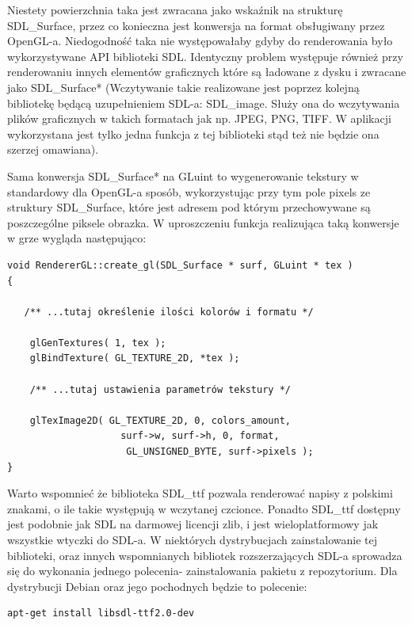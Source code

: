 Niestety powierzchnia taka jest zwracana jako wskaźnik na strukturę SDL\_Surface, przez co konieczna jest konwersja na format obsługiwany przez OpenGL-a. Niedogodność taka nie występowałaby gdyby do renderowania było wykorzystywane API biblioteki SDL. Identyczny problem występuje również przy renderowaniu innych elementów graficznych które są ładowane z dysku i zwracane jako SDL\_Surface* (Wczytywanie takie realizowane jest poprzez kolejną bibliotekę będącą uzupełnieniem SDL-a: SDL\_image. Służy ona do wczytywania plików graficznych w takich formatach jak np. JPEG, PNG, TIFF. W aplikacji wykorzystana jest tylko jedna funkcja 
z tej biblioteki stąd też nie będzie ona szerzej omawiana).

Sama konwersja SDL\_Surface* na GLuint to wygenerowanie tekstury w standardowy dla OpenGL-a sposób, wykorzystując przy tym pole pixels ze struktury SDL\_Surface, które jest adresem pod którym przechowywane są poszczególne piksele obrazka. W uproszczeniu funkcja realizująca taką konwersje w grze wygląda następująco:

\begingroup
\fontsize{10pt}{12pt}\selectfont
\begin{verbatim}  
void RendererGL::create_gl(SDL_Surface * surf, GLuint * tex )
{
 
   /** ...tutaj określenie ilości kolorów i formatu */
  
    glGenTextures( 1, tex );
    glBindTexture( GL_TEXTURE_2D, *tex );

    /** ...tutaj ustawienia parametrów tekstury */

    glTexImage2D( GL_TEXTURE_2D, 0, colors_amount,
    			  	surf->w, surf->h, 0, format, 
    			 	 GL_UNSIGNED_BYTE, surf->pixels );
}
\end{verbatim}
\endgroup

Warto wspomnieć że biblioteka SDL\_ttf pozwala renderować napisy z polskimi znakami, o ile takie występują w wczytanej czcionce. Ponadto SDL\_ttf dostępny jest podobnie jak SDL na darmowej licencji zlib, i jest wieloplatformowy jak wszystkie wtyczki do SDL-a. W niektórych dystrybucjach zainstalowanie tej biblioteki, oraz innych wspomnianych bibliotek rozszerzających SDL-a sprowadza się do wykonania jednego polecenia- zainstalowania pakietu z repozytorium. Dla dystrybucji Debian oraz jego pochodnych będzie to polecenie:
\begin{verbatim}
apt-get install libsdl-ttf2.0-dev 
\end{verbatim}